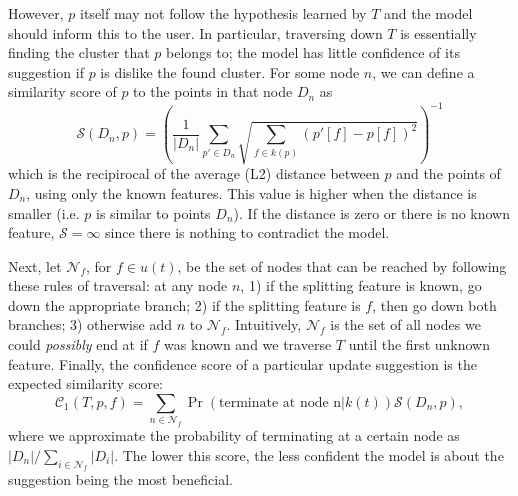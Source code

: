 \documentclass[conference]{IEEEtran}
\begin{document}
However, $p$ itself may not follow the hypothesis learned by $T$ and the
model should inform this to the user. In particular, traversing down $T$
is essentially finding the cluster that $p$ belongs to; the model has little
confidence of its suggestion if $p$ is dislike the found cluster. For some
node $n$, we can define a similarity score of $p$ to the points in that
node $D_n$ as
$$ \mathcal{S}(D_n,p) = \left(
\frac{1}{|D_n|} \sum_{p' \in D_n } \sqrt{ \sum_{f \in k(p)} (p'[f] - p[f])^2 } 
\right)^{-1}$$
which is the recipirocal of the average (L2) distance between $p$ and the points
of $D_n$, using only the known features. This value is higher when the
distance is smaller (i.e. $p$ is similar to points $D_n$). If the distance is zero
or there is no known feature, $\mathcal{S} = \infty$ since there is
nothing to contradict the model.

Next, let $\mathcal{N}_f$, for $f \in u(t)$, be the set of nodes that can be
reached by following these rules of traversal: at any node $n$, 1) if
the splitting feature is known, go down the appropriate branch; 2) if the
splitting feature is $f$, then go down both branches; 3) otherwise add
$n$ to $\mathcal{N}_f$. Intuitively, $\mathcal{N}_f$ is the set of all
nodes we could \emph{possibly} end at if $f$ was known and we traverse
$T$ until the first unknown feature. Finally, the confidence score of a particular
update suggestion is the expected similarity score:
$$ \mathcal{C}_1(T,p,f) = \sum_{n \in \mathcal{N}_f} \Pr(
\text{terminate at node n} | k(t) ) \mathcal{S}(D_n, p), $$
where we approximate the probability of terminating at a certain node as
$|D_n| / \sum_{i \in \mathcal{N}_f} |D_i|$. The lower this score, the less confident
the model is about the suggestion being the most beneficial.
\end{document}
